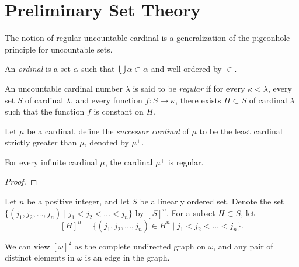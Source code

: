 \newpage
\section{Preliminary Set Theory}
The notion of regular uncountable cardinal is a generalization of the pigeonhole principle for uncountable sets.

\begin{definition}[ordinal]
    An \emph{ordinal} is a set $\alpha$ such that $\bigcup\alpha\subset\alpha$ and well-ordered by $\in$.
\end{definition}

\begin{definition}[cardinal]
\end{definition}

\begin{definition}
    An uncountable cardinal number $\lambda$ is said to be \textit{regular} if for every $\kappa<\lambda$, every set $S$ of cardinal $\lambda$, and every function $f:S\to\kappa$, there exists $H\subset S$ of cardinal $\lambda$ such that the function $f$ is constant on $H$.
\end{definition}


\begin{definition}
    Let $\mu$ be a cardinal, define the \emph{successor cardinal} of $\mu$ to be the least cardinal strictly greater than $\mu$, denoted by $\mu^+$.
\end{definition}

\begin{proposition}
    For every infinite cardinal $\mu$, the cardinal $\mu^+$ is regular.
\end{proposition}
\begin{proof}
    
\end{proof}


\begin{notation}
    Let $n$ be a positive integer, and let $S$ be a linearly ordered set. Denote the set $\{(j_1, j_2, \ldots, j_n)\mid j_1<j_2<\ldots<j_n\}$ by $[S]^n$. For a subset $H\subset S$, let
    \[
        [H]^n=\{(j_1, j_2, \ldots, j_n)\in H^n\mid j_1<j_2<\ldots<j_n\}.
    \]
\end{notation}

\begin{example}
    We can view $[\omega]^2$ as the complete undirected graph on $\omega$, and any pair of distinct elements in $\omega$ is an edge in the graph.
\end{example}

